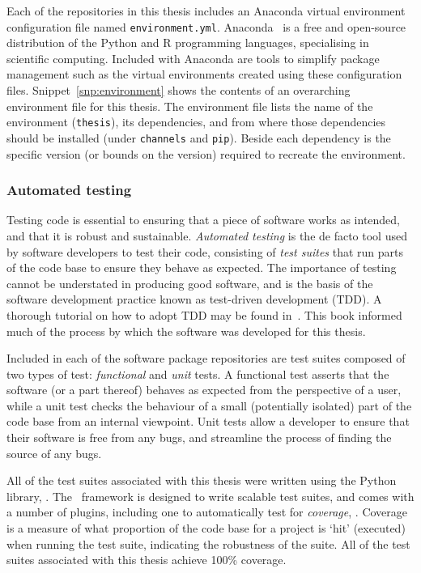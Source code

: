 Each of the repositories in this thesis includes an Anaconda virtual environment
configuration file named \texttt{environment.yml}.
Anaconda~\cite{anaconda} is a free and open-source distribution of the Python
and R programming languages, specialising in scientific computing. Included with
Anaconda are tools to simplify package management such as the virtual
environments created using these configuration files.
Snippet~\ref{snp:environment} shows the contents of an overarching environment
file for this thesis. The environment file lists the name of the environment
(\texttt{thesis}), its dependencies, and from where those
dependencies should be installed (under \texttt{channels} and
\texttt{pip}). Beside each dependency is the specific version (or
bounds on the version) required to recreate the environment.

\subsubsection{Automated testing}

Testing code is essential to ensuring that a piece of software works as
intended, and that it is robust and sustainable. \emph{Automated testing} is the
de facto tool used by software developers to test their code, consisting of
\emph{test suites} that run parts of the code base to ensure they behave as
expected. The importance of testing cannot be understated in producing good
software, and is the basis of the software development practice known as
test-driven development (TDD). A thorough tutorial on how to adopt TDD may be
found in~\cite{Percival2017}. This book informed much of the process by which
the software was developed for this thesis. 

Included in each of the software package repositories are test suites composed
of two types of test: \emph{functional} and \emph{unit} tests. A functional test
asserts that the software (or a part thereof) behaves as expected from the
perspective of a user, while a unit test checks the behaviour of a small
(potentially isolated) part of the code base from an internal viewpoint. Unit
tests allow a developer to ensure that their software is free from any bugs, and
streamline the process of finding the source of any bugs.

All of the test suites associated with this thesis were written using the Python
library, \href{https://docs.pytest.org/en/stable/}{\pytest}. The \pytest\
framework is designed to write scalable test suites, and comes with a number of
plugins, including one to automatically test for \emph{coverage},
\href{https://pytest-cov.readthedocs.io/en/latest/}{\pytestcov}.
Coverage is a measure of what proportion of the code base for a project is `hit'
(executed) when running the test suite, indicating the robustness of the suite.
All of the test suites associated with this thesis achieve 100\% coverage.


